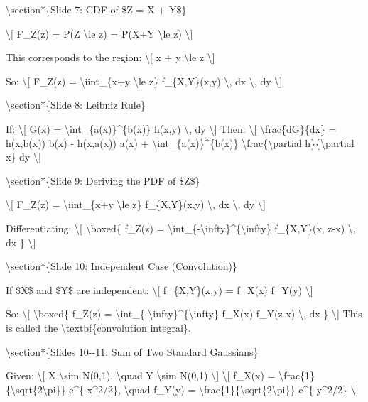 \textbackslash section*\{Slide 7: CDF of \$Z = X + Y\$\}

\textbackslash{[} F\_Z(z) = P(Z \textbackslash le z) = P(X+Y
\textbackslash le z) \textbackslash{]}

This corresponds to the region: \textbackslash{[} x + y
\textbackslash le z \textbackslash{]}

So: \textbackslash{[} F\_Z(z) = \textbackslash iint\_\{x+y
\textbackslash le z\} f\_\{X,Y\}(x,y) \textbackslash, dx \textbackslash,
dy \textbackslash{]}

\textbackslash section*\{Slide 8: Leibniz Rule\}

If: \textbackslash{[} G(x) = \textbackslash int\_\{a(x)\}\^{}\{b(x)\}
h(x,y) \textbackslash, dy \textbackslash{]} Then: \textbackslash{[}
\textbackslash frac\{dG\}\{dx\} = h(x,b(x)) b\textquotesingle(x) -
h(x,a(x)) a\textquotesingle(x) +
\textbackslash int\_\{a(x)\}\^{}\{b(x)\}
\textbackslash frac\{\textbackslash partial h\}\{\textbackslash partial
x\} dy \textbackslash{]}

\textbackslash section*\{Slide 9: Deriving the PDF of \$Z\$\}

\textbackslash{[} F\_Z(z) = \textbackslash iint\_\{x+y \textbackslash le
z\} f\_\{X,Y\}(x,y) \textbackslash, dx \textbackslash, dy
\textbackslash{]}

Differentiating: \textbackslash{[} \textbackslash boxed\{ f\_Z(z) =
\textbackslash int\_\{-\textbackslash infty\}\^{}\{\textbackslash infty\}
f\_\{X,Y\}(x, z-x) \textbackslash, dx \} \textbackslash{]}

\textbackslash section*\{Slide 10: Independent Case (Convolution)\}

If \$X\$ and \$Y\$ are independent: \textbackslash{[} f\_\{X,Y\}(x,y) =
f\_X(x) f\_Y(y) \textbackslash{]}

So: \textbackslash{[} \textbackslash boxed\{ f\_Z(z) =
\textbackslash int\_\{-\textbackslash infty\}\^{}\{\textbackslash infty\}
f\_X(x) f\_Y(z-x) \textbackslash, dx \} \textbackslash{]} This is called
the \textbackslash textbf\{convolution integral\}.

\textbackslash section*\{Slides 10-\/-11: Sum of Two Standard
Gaussians\}

Given: \textbackslash{[} X \textbackslash sim N(0,1),
\textbackslash quad Y \textbackslash sim N(0,1) \textbackslash{]}
\textbackslash{[} f\_X(x) =
\textbackslash frac\{1\}\{\textbackslash sqrt\{2\textbackslash pi\}\}
e\^{}\{-x\^{}2/2\}, \textbackslash quad f\_Y(y) =
\textbackslash frac\{1\}\{\textbackslash sqrt\{2\textbackslash pi\}\}
e\^{}\{-y\^{}2/2\} \textbackslash{]}

